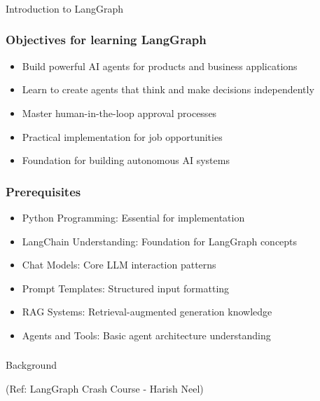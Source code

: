 \begin{frame}[fragile]\frametitle{}
\begin{center}
{\Large Introduction to LangGraph}
\end{center}
\end{frame}


\begin{frame}[fragile]\frametitle{Objectives for learning LangGraph}
      \begin{itemize}
        \item Build powerful AI agents for products and business applications
        \item Learn to create agents that think and make decisions independently
        \item Master human-in-the-loop approval processes
        \item Practical implementation for job opportunities
        \item Foundation for building autonomous AI systems
      \end{itemize}
\end{frame}

\begin{frame}[fragile]\frametitle{Prerequisites}
      \begin{itemize}
        \item Python Programming: Essential for implementation
        \item LangChain Understanding: Foundation for LangGraph concepts
        \item Chat Models: Core LLM interaction patterns
        \item Prompt Templates: Structured input formatting
        \item RAG Systems: Retrieval-augmented generation knowledge
        \item Agents and Tools: Basic agent architecture understanding
      \end{itemize}
\end{frame}

\begin{frame}[fragile]\frametitle{}
\begin{center}
{\Large Background}

{\tiny (Ref: LangGraph Crash Course - Harish Neel)}

\end{center}
\end{frame}

